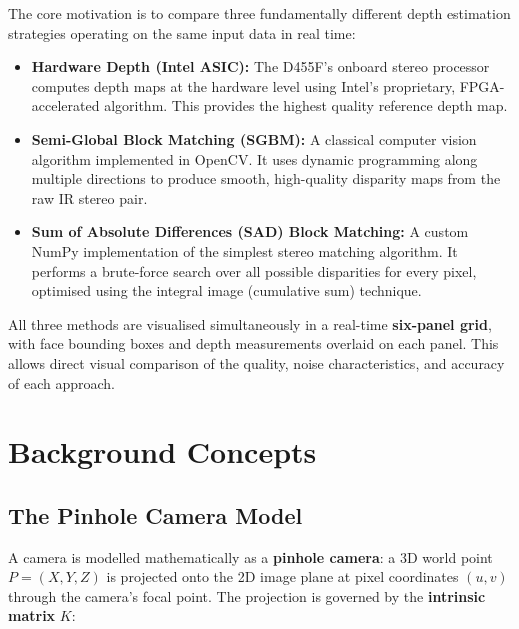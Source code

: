 \documentclass[12pt, a4paper]{article}
\begin{document}
The core motivation is to compare three fundamentally different depth estimation
strategies operating on the same input data in real time:

\begin{itemize}
  \item \textbf{Hardware Depth (Intel ASIC):} The D455F's onboard stereo
        processor computes depth maps at the hardware level using Intel's
        proprietary, FPGA-accelerated algorithm. This provides the highest
        quality reference depth map.

  \item \textbf{Semi-Global Block Matching (SGBM):} A classical computer vision
        algorithm implemented in OpenCV. It uses dynamic programming along
        multiple directions to produce smooth, high-quality disparity maps from
        the raw IR stereo pair.

  \item \textbf{Sum of Absolute Differences (SAD) Block Matching:} A custom
        NumPy implementation of the simplest stereo matching algorithm. It
        performs a brute-force search over all possible disparities for every
        pixel, optimised using the integral image (cumulative sum) technique.
\end{itemize}

All three methods are visualised simultaneously in a real-time
\textbf{six-panel grid}, with face bounding boxes and depth measurements
overlaid on each panel. This allows direct visual comparison of the quality,
noise characteristics, and accuracy of each approach.

\section{Background Concepts}

\subsection{The Pinhole Camera Model}

A camera is modelled mathematically as a \textbf{pinhole camera}: a 3D world
point $P = (X, Y, Z)$ is projected onto the 2D image plane at pixel coordinates
$(u, v)$ through the camera's focal point. The projection is governed by the
\textbf{intrinsic matrix} $K$:
\end{document}
